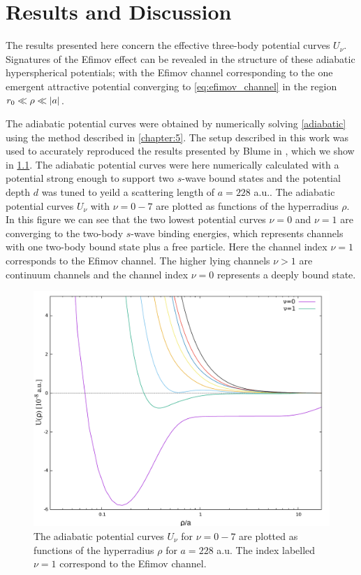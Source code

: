 \chapter{Results and Discussion}
The results presented here concern the effective three-body potential curves $U_{\nu}$. Signatures of the Efimov effect can be revealed in the structure of these adiabatic hyperspherical potentials; with the Efimov channel corresponding to the one emergent attractive potential converging to \eqref{eq:efimov_channel} in the region $r_0 \ll \rho \ll
\lvert a\rvert$.

The adiabatic potential curves were obtained by numerically solving  \eqref{adiabatic} using the method described in \cref{chapter:5}. The setup described in this work was used to accurately reproduced the results presented by Blume in \cite{Blume2002}, which we show in \cref{fig:res_2}. The adiabatic potential curves were here numerically calculated with a potential strong enough to support two $s$-wave bound states and the potential depth $d$ was tuned to yeild a scattering length of $a=228$ a.u.. The adiabatic potential curves $U_{\nu}$ with $\nu = 0-7$ are plotted as functions of the hyperradius $\rho$. In this figure we can see that the two lowest potential curves $\nu = 0$ and $\nu = 1$ are converging to the two-body $s$-wave binding energies, which represents channels with one two-body bound  state plus a free particle. Here the channel index $\nu=1$ corresponds to the Efimov channel. The higher lying channels $\nu>1$ are continuum channels and the channel index $\nu=0$ represents a deeply bound state.

\begin{figure}
	\includegraphics[width=\linewidth]{adiabatic.pdf}
	\caption{The adiabatic potential curves $U_{\nu}$ for $\nu=0-7$ are plotted as functions of the hyperradius $\rho$ for $a=228$ a.u. The index labelled $\nu=1$ correspond to the Efimov channel.}
	\label{fig:res_2}
\end{figure}

